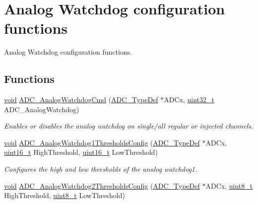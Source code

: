 \hypertarget{group___a_d_c___group2}{\section{Analog Watchdog configuration functions}
\label{group___a_d_c___group2}
}


Analog Watchdog configuration functions.  


\subsection*{Functions}
\begin{DoxyCompactItemize}
\item 
\hyperlink{group___n_a_m_e_ga18028b8badbf1ea7e704ccac3c488e82}{void} \hyperlink{group___a_d_c___group2_gad017d69bec6e497afd35ba25ea22d86e}{A\-D\-C\-\_\-\-Analog\-Watchdog\-Cmd} (\hyperlink{struct_a_d_c___type_def}{A\-D\-C\-\_\-\-Type\-Def} $\ast$A\-D\-Cx, \hyperlink{stdint_8h_a435d1572bf3f880d55459d9805097f62}{uint32\-\_\-t} A\-D\-C\-\_\-\-Analog\-Watchdog)
\begin{DoxyCompactList}\small\item\em Enables or disables the analog watchdog on single/all regular or injected channels. \end{DoxyCompactList}\item 
\hyperlink{group___n_a_m_e_ga18028b8badbf1ea7e704ccac3c488e82}{void} \hyperlink{group___a_d_c___group2_gaa8866d19ed23ab2d536cdb19f1a203c3}{A\-D\-C\-\_\-\-Analog\-Watchdog1\-Thresholds\-Config} (\hyperlink{struct_a_d_c___type_def}{A\-D\-C\-\_\-\-Type\-Def} $\ast$A\-D\-Cx, \hyperlink{stdint_8h_a273cf69d639a59973b6019625df33e30}{uint16\-\_\-t} High\-Threshold, \hyperlink{stdint_8h_a273cf69d639a59973b6019625df33e30}{uint16\-\_\-t} Low\-Threshold)
\begin{DoxyCompactList}\small\item\em Configures the high and low thresholds of the analog watchdog1. \end{DoxyCompactList}\item 
\hyperlink{group___n_a_m_e_ga18028b8badbf1ea7e704ccac3c488e82}{void} \hyperlink{group___a_d_c___group2_gad30b941c83a2f7400d3a8802b33d3bde}{A\-D\-C\-\_\-\-Analog\-Watchdog2\-Thresholds\-Config} (\hyperlink{struct_a_d_c___type_def}{A\-D\-C\-\_\-\-Type\-Def} $\ast$A\-D\-Cx, \hyperlink{stdint_8h_aba7bc1797add20fe3efdf37ced1182c5}{uint8\-\_\-t} High\-Threshold, \hyperlink{stdint_8h_aba7bc1797add20fe3efdf37ced1182c5}{uint8\-\_\-t} Low\-Threshold)

\end{DoxyCompactItemize}
